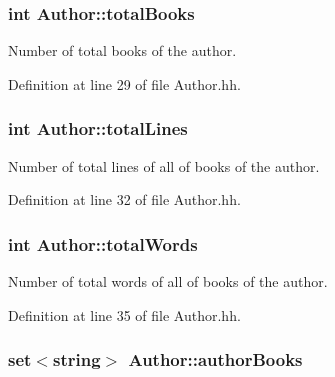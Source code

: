 \subsubsection[{\texorpdfstring{total\+Books}{totalBooks}}]{\setlength{\rightskip}{0pt plus 5cm}int Author\+::total\+Books\hspace{0.3cm}{\ttfamily [private]}}\hypertarget{class_author_ac870b8c861aa0f69cd2c4e7b8d414902}{}\label{class_author_ac870b8c861aa0f69cd2c4e7b8d414902}


Number of total books of the author. 



Definition at line 29 of file Author.\+hh.

\subsubsection[{\texorpdfstring{total\+Lines}{totalLines}}]{\setlength{\rightskip}{0pt plus 5cm}int Author\+::total\+Lines\hspace{0.3cm}{\ttfamily [private]}}\hypertarget{class_author_a8d818414bbd909287641b388601bf61a}{}\label{class_author_a8d818414bbd909287641b388601bf61a}


Number of total lines of all of books of the author. 



Definition at line 32 of file Author.\+hh.

\subsubsection[{\texorpdfstring{total\+Words}{totalWords}}]{\setlength{\rightskip}{0pt plus 5cm}int Author\+::total\+Words\hspace{0.3cm}{\ttfamily [private]}}\hypertarget{class_author_a478c72fff965eb1ee8fcaddfe173715b}{}\label{class_author_a478c72fff965eb1ee8fcaddfe173715b}


Number of total words of all of books of the author. 



Definition at line 35 of file Author.\+hh.

\subsubsection[{\texorpdfstring{author\+Books}{authorBooks}}]{\setlength{\rightskip}{0pt plus 5cm}set$<$string$>$ Author\+::author\+Books\hspace{0.3cm}{\ttfamily [private]}}\hypertarget{class_author_ad9ffe450cdafed2242936f6fcafa22b4}{}\label{class_author_ad9ffe450cdafed2242936f6fcafa22b4}


